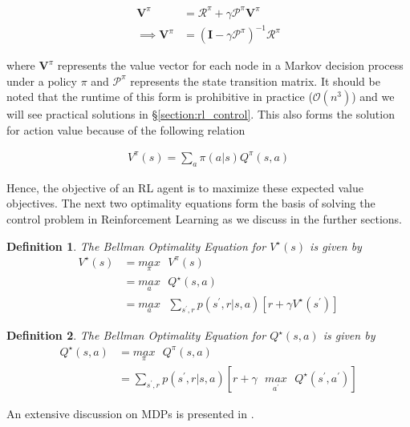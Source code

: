 \documentclass[12pt,a4paper]{article}
\newtheorem{definition}{Definition}
\begin{document}
\begin{align} \label{eq:bellman_solution}
\mathbf{V}^\pi &= \mathcal{R}^\pi + \gamma \mathcal{P}^\pi \mathbf{V}^\pi \\
\implies \mathbf{V}^\pi &= (\mathbf{I} - \gamma \mathcal{P}^\pi)^{-1} \mathcal{R}^\pi
\end{align}

where $\mathbf{V}^\pi$ represents the value vector for each node in a Markov decision 
process under a policy $\pi$ and $\mathcal{P}^\pi$ represents the state transition
matrix. It should be noted that the runtime of this form is prohibitive in practice 
($\mathcal{O}(n^3)$) and we will see practical solutions in \S\ref{section:rl_control}. This also
forms the solution for action value because of the following relation

\begin{align}
V^\pi(s) = \sum_{a} \pi(a|s) Q^\pi(s,a)
\end{align}

Hence, the objective of an RL agent is to maximize these expected value objectives. The next
two optimality equations form the basis of solving the control problem in Reinforcement
Learning as we discuss in the further sections.

\begin{definition} \label{def:bellman_opt_state_value}
The Bellman Optimality Equation for $V^\star(s)$ is given by
\begin{align}
V^\star(s) &= \underset{\pi}{max}\text{ }V^\pi(s) \\ \nonumber
&= \underset{a}{max}\text{ } Q^\star(s,a) \\ \nonumber
&= \underset{a}{max}\text{ } \sum_{s^\prime, r} p(s^\prime,r | s, a) \left[ r + \gamma V^\star(s^\prime) \right]
\end{align}
\end{definition}

\begin{definition} \label{def:bellman_opt_action_value}
The Bellman Optimality Equation for $Q^\star(s,a)$ is given by
\begin{align}
Q^\star(s,a) &= \underset{\pi}{max}\text{ }Q^\pi(s,a) \\ \nonumber
&= \sum_{s^\prime, r} p(s^\prime,r | s, a) \left[ r + \gamma\text{ }\underset{a^\prime}{max}\text{ }Q^\star(s^\prime,a^\prime) \right]
\end{align}
\end{definition}

An extensive discussion on MDPs is presented in \cite{dimitri2017dynamic}.
\end{document}
